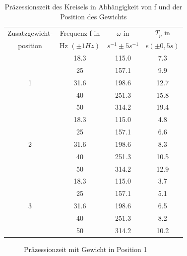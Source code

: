 \begin{table}[H]
  \centering
  \begin{tabular}{c | c | c | c}
    Zusatzgewicht- & Frequenz f in& $\omega$ in &$T_p$ in\\
    position & Hz $(\pm 1 Hz)$ &  $s^{-1}\pm 5 s^{-1}$ & s$(\pm 0,5 s)$\\ \hline
      & \num{18,3} & \num {115,0} & \num{7,3}\\
      & \num{25} & \num {157,1}& \num{9,9}\\
    1 & \num{31,6} & \num {198,6} & \num{12,7}\\
      & \num{40} & \num {251,3}& \num{15,8}\\
      & \num{50} & \num {314,2}&\num{19,4}\\ \hline
      & \num{18,3} & \num {115,0}& \num{4,8}\\
      & \num{25} & \num {157,1}& \num{6,6}\\
    2 & \num{31,6} & \num {198,6}& \num{8,3}\\
      & \num{40} & \num {251,3}& \num{10,5}\\
      & \num{50} & \num {314,2}& \num{12,9}\\ \hline
      & \num{18,3} & \num {115,0}& \num{3,7}\\
      & \num{25} & \num {157,1}& \num{5,1}\\
    3 & \num{31,6} & \num {198,6}& \num{6,5}\\
      & \num{40} & \num {251,3}& \num{8,2}\\
      & \num{50} & \num {314,2}& \num{10,2}\\ 
  \end{tabular}
  \caption{Präzessionszeit des Kreisels in Abhängigkeit von f und der Position des Gewichts}
  \label{tab:Präzezeit}
\end{table}

\begin{figure}[H]
  \centering
  \caption{Präzessionzeit mit Gewicht in Position 1}
  \label{fig:pos1}
\end{figure}

